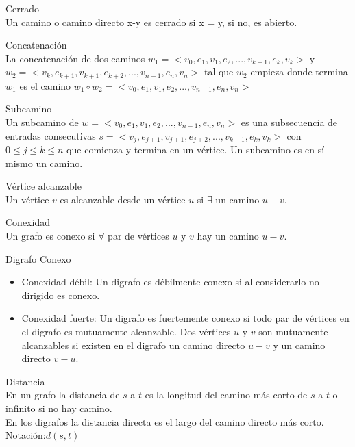 \documentclass{article}
\begin{document}
\begin{defn}
Cerrado \\ Un camino o camino directo x-y es cerrado si x = y, si no, es abierto.
\end{defn}

\begin{defn}
Concatenación \\ La concatenación de dos caminos $w_{1} = < v_{0}, e_{1}, v_{1}, e_{2},..., v_{k-1}, e_{k}, v_{k} >$ y $w_{2} = < v_{k}, e_{k+1}, v_{k+1}, e_{k+2},..., v_{n-1}, e_{n}, v_{n} >$ tal que $w_{2}$ empieza donde termina $w_{1}$ es el camino $w_{1}\circ w_{2} = < v_{0}, e_{1}, v_{1}, e_{2},..., v_{n-1}, e_{n}, v_{n} >$
\end{defn}

\begin{defn}
Subcamino \\ Un subcamino de $w = < v_{0}, e_{1}, v_{1}, e_{2},..., v_{n-1}, e_{n}, v_{n} >$ es una subsecuencia de entradas consecutivas $s = < v_{j}, e_{j+1}, v_{j+1}, e_{j+2},..., v_{k-1}, e_{k}, v_{k} >$ con $0\leq j \leq k \leq n$ que comienza y termina en un vértice. Un subcamino es en sí mismo un camino.
\end{defn}

\begin{defn}
Vértice alcanzable \\  Un vértice $v$ es alcanzable desde un vértice $u$ si $\exists$ un camino $u-v$.
\end{defn}

\begin{defn}
Conexidad \\ Un grafo es conexo si $\forall$ par de vértices $u$ y $v$ hay un camino $u-v$.
\end{defn}

\begin{defn}
Digrafo Conexo
\begin{itemize}
    \item Conexidad débil: Un digrafo es débilmente conexo si al considerarlo no dirigido es conexo.
    \item Conexidad fuerte: Un digrafo es fuertemente conexo si todo par de vértices en el digrafo es mutuamente alcanzable. Dos vértices $u$ y $v$ son mutuamente alcanzables si existen en el digrafo un camino directo $u-v$ y un camino directo $v-u$.
\end{itemize} 
\end{defn}

\begin{defn}
Distancia \\ En un grafo la distancia de $s$ a $t$ es la longitud del camino más corto de $s$ a $t$ o infinito si no hay camino.\\
En los digrafos la distancia directa es el largo del camino directo más corto.\\
Notación:$d(s,t)$
\end{defn}
\end{document}
